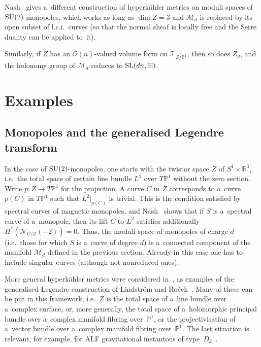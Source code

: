 \documentclass[pdftex]{sigma}
\numberwithin{equation}{section}
\begin{document}
\begin{Remark}
Nash~\cite{Nash} gives a~dif\/ferent construction of hyperk\"ahler metrics on moduli spaces of ${\rm SU}(2)$-monopoles, which
works as long as $\dim Z=3$ and ${\mathcal{M}}_d$ is replaced by its open subset of l.c.i.\
curves (so that the normal sheaf is locally free and the Serre duality can be applied to~it).
\end{Remark}

\begin{Remark}
Similarly, if $Z$ has an ${\mathcal{O}}(n)$-valued volume form on ${\mathcal{T}}_{Z/{\mathbb{P}}^1}$, then so does
$Z_d$, and the holonomy group of ${\mathcal{M}}_d$ reduces to ${\rm SL}(dn,{\mathbb{H}})$.
\end{Remark}

\section{Examples}

\subsection{Monopoles and the generalised Legendre transform}

In the case of ${\rm SU}(2)$-monopoles, one starts with the twistor space $Z$ of $S^1\times {\mathbb{R}}^3$, i.e.\
the total space of certain line bundle $L^2$ over $T{\mathbb{P}}^1$ without the zero section.
Write $p:Z\to T{\mathbb{P}}^1$ for the projection.
A curve $C$ in $Z$ corresponds to a~curve $p(C)$ in $T{\mathbb{P}}^1$ such that $L^2|_{p(C)}$ is trivial.
This is the condition satisf\/ied by spectral curves of magnetic monopoles, and Nash~\cite{Nash} shows that if $S$ is
a~spectral curve of a~monopole, then its lift $C$ to $L^2$ satisf\/ies additionally $H^\ast({\mathcal{N}}_{C/Z}(-2))=0$.
Thus, the moduli space of monopoles of charge $d$ (i.e.\
those for which $S$ is a~curve of degree $d$) is a~connected component of the manifold ${\mathcal{M}}_d$ def\/ined in the
previous section.
Already in this case one has to include singular curves (although not nonreduced ones).

More general hyperk\"ahler metrics were considered in~\cite{Bie}, as examples of the generalised Legendre construction
of Lindstr\"om and Ro\v{c}ek~\cite{LR}.
Many of these can be put in this framework, i.e.~$Z$ is the total space of a~line bundle over a~complex surface, or, more generally, the total space of a~holomorphic
principal bundle over a~complex manifold f\/ibring over~${\mathbb{P}}^1$, or the projectivisation of a~vector bundle over
a~complex manifold f\/ibring over~${\mathbb{P}}^1$.
The last situation is relevant, for example, for ALF gravitational instantons of type~$D_k$~\cite{CH}.
\end{document}
